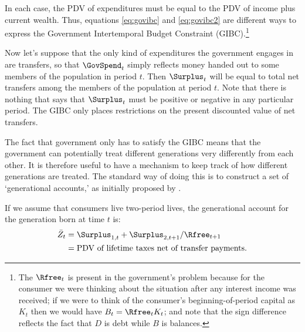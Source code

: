 \documentclass{handout}
\begin{document}
In each case, the PDV of expenditures must be equal to the PDV of 
income plus current wealth.  Thus, equations \eqref{eq:govibc} and 
\eqref{eq:govibc2} are different ways to express the Government 
Intertemporal Budget Constraint (GIBC).\footnote{The $\Rfree_{t}$ is present
in the government's problem because for the consumer we were thinking
about the situation after any interest income was received; if we
were to think of the consumer's beginning-of-period capital as $K_{t}$
then we would have $B_{t} = \Rfree_{t} K_{t}$; and note that the sign difference
reflects the fact that $D$ is debt while $B$ is balances.}

Now let's suppose that the only kind of expenditures the government   
engages in are transfers, so that $\GovSpend_{t}$ simply reflects money handed 
out to some members of the population in period $t$.  Then $\Surplus_{t}$ 
will be equal to total net transfers among the members of the 
population at period $t$.  Note 
that there is nothing that says that $\Surplus_{t}$ must be positive or 
negative in any particular period.  The GIBC only places restrictions 
on the present discounted value of net transfers.

The fact that government only has to satisfy the GIBC means that the 
government can potentially treat different generations very 
differently from each other.  It is therefore useful to have a 
mechanism to keep track of how different generations are treated.  The 
standard way of doing this is to construct a set of `generational 
accounts,' as initially proposed by \cite{akg:genaccts}.

If we assume that consumers live two-period lives, the generational
account for the generation born at time $t$ is:
\begin{equation}\begin{gathered}\begin{aligned}
        \bar{Z}_{t} & =  \Surplus_{1,t}+\Surplus_{2,t+1}/\Rfree_{t+1}  \\
         & =  \mbox{PDV of lifetime taxes net of transfer payments}.
\end{aligned}\end{gathered}\end{equation}
\end{document}

